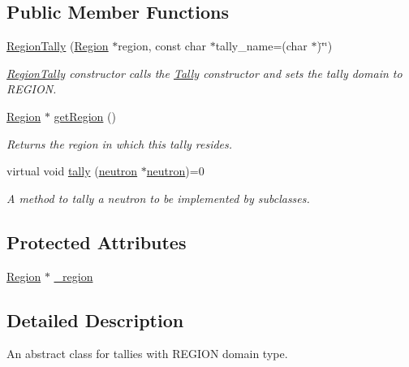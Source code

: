 \subsection*{Public Member Functions}
\begin{DoxyCompactItemize}
\item 
\hyperlink{classRegionTally_a82b509ab3c69d15f67b3eb1c15b94c11}{Region\-Tally} (\hyperlink{classRegion}{Region} $\ast$region, const char $\ast$tally\-\_\-name=(char $\ast$)\char`\"{}\char`\"{})
\begin{DoxyCompactList}\small\item\em \hyperlink{classRegionTally}{Region\-Tally} constructor calls the \hyperlink{classTally}{Tally} constructor and sets the tally domain to R\-E\-G\-I\-O\-N. \end{DoxyCompactList}\item 
\hyperlink{classRegion}{Region} $\ast$ \hyperlink{classRegionTally_afd80b404adc8b6eaca328f992e23591e}{get\-Region} ()
\begin{DoxyCompactList}\small\item\em Returns the region in which this tally resides. \end{DoxyCompactList}\item 
\hypertarget{classRegionTally_ae146fd937e34306fdd5cc4aac44a3856}{virtual void \hyperlink{classRegionTally_ae146fd937e34306fdd5cc4aac44a3856}{tally} (\hyperlink{structneutron}{neutron} $\ast$\hyperlink{structneutron}{neutron})=0}\label{classRegionTally_ae146fd937e34306fdd5cc4aac44a3856}

\begin{DoxyCompactList}\small\item\em A method to tally a neutron to be implemented by subclasses. \end{DoxyCompactList}\end{DoxyCompactItemize}
\subsection*{Protected Attributes}
\begin{DoxyCompactItemize}
\item 
\hyperlink{classRegion}{Region} $\ast$ \hyperlink{classRegionTally_ac9b5e8a2d01f73c79a22d5d6da0a376d}{\-\_\-region}
\end{DoxyCompactItemize}


\subsection{Detailed Description}
An abstract class for tallies with R\-E\-G\-I\-O\-N domain type. 

